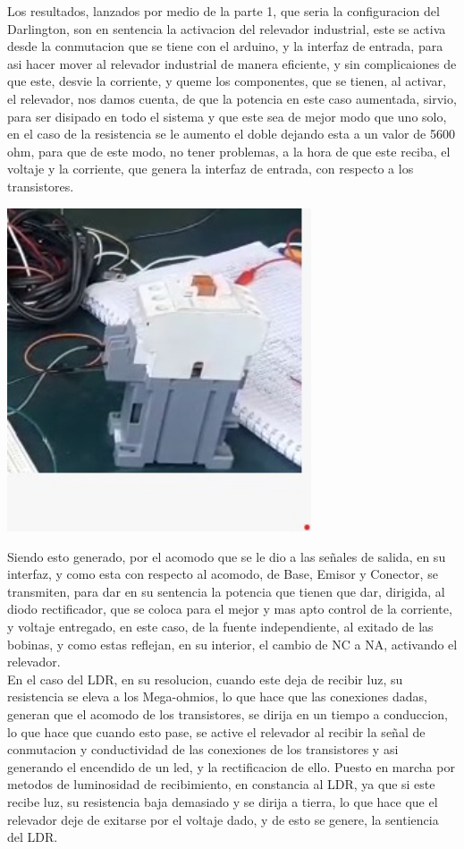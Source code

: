 \documentclass[12pt,a4paper]{article}
\begin{document}
Los resultados, lanzados por medio de la parte 1, que seria la configuracion del Darlington, son en sentencia la activacion del relevador industrial, este se activa desde la conmutacion que se tiene con el arduino, y la interfaz de entrada, para asi hacer mover al relevador industrial de manera eficiente, y sin complicaiones de que este, desvie la corriente, y queme los componentes, que se tienen, al activar, el relevador, nos damos cuenta, de que la potencia en este caso aumentada, sirvio, para ser disipado en todo el sistema y que este sea de mejor modo que uno solo, en el caso de la resistencia se le aumento el doble dejando esta a un valor de 5600 ohm, para que de este modo, no tener problemas, a la hora de que este reciba, el voltaje y la corriente, que genera la interfaz de entrada, con respecto a los transistores.\\

\begin{center}
\includegraphics[width=9cm]{Rele.jpeg} 
\end{center}

Siendo esto generado, por el acomodo que se le dio a las señales de salida, en su interfaz, y como esta con respecto al acomodo, de Base, Emisor y Conector, se transmiten, para dar en su sentencia la potencia que tienen que dar, dirigida, al diodo rectificador, que se coloca para el mejor y mas apto control de la corriente, y voltaje entregado, en este caso, de la fuente independiente, al exitado de las bobinas, y como estas reflejan, en su interior, el cambio de NC a NA, activando el relevador.\\


En el caso del LDR, en su resolucion, cuando este deja de recibir luz, su resistencia se eleva a los Mega-ohmios, lo que hace que las conexiones dadas, generan que el acomodo de los transistores, se dirija en un tiempo a conduccion, lo que hace que cuando esto pase, se active el relevador al recibir la señal de conmutacion y conductividad de las conexiones de los transistores y asi generando el encendido de un led, y la rectificacion de ello. Puesto en marcha por metodos de luminosidad de recibimiento, en constancia al LDR, ya que si este recibe luz, su resistencia baja demasiado y se dirija a tierra, lo que hace que el relevador deje de exitarse por el voltaje dado, y de esto se genere, la sentiencia del LDR.\\
\end{document}
